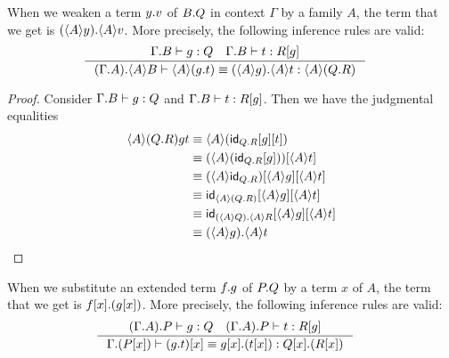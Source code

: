 \begin{lem}
When we weaken a term $\tmext{B}{Q}{y}{v}$ of $\ctxext{B}{Q}$ in context $\Gamma$ by
a family $A$, the term that we get is $\tmext{\ctxwk{A}{B}}{\ctxwk{A}{Q}}{\ctxwk{A}{y}}{\ctxwk{A}{v}}$. More
precisely, the following inference rules are valid:
\begin{align*}
& \inference
  {\jterm{{\Gamma}{B}}{Q}{g}
   \jterm{{\Gamma}{B}}{\subst{g}{R}}{t}}
  {\jtermeq
    {{{\Gamma}{A}}{\ctxwk{A}{B}}}
    {\ctxwk{A}{\ctxext{Q}{R}}}
    {\ctxwk{A}{\tmext{Q}{R}{g}{t}}}
    {\tmext{\ctxwk{A}{Q}}{\ctxwk{A}{R}}{\ctxwk{A}{g}}{\ctxwk{A}{t}}}}
\end{align*}
\end{lem}

\begin{proof}
Consider $\jterm{{\Gamma}{B}}{Q}{g}$ and $\jterm{{\Gamma}{B}}{\subst{g}{R}}{t}$.
Then we have the judgmental equalities
\begin{align*}
\ctxwk{A}{\ctxext{Q}{R}{g}{t}}
& \jdeq \ctxwk{A}{\subst{t}{{g}{\idfunc[\ctxext{Q}{R}]}}}\\
& \jdeq \subst{\ctxwk{A}{t}}{\ctxwk{A}{\subst{g}{\idfunc[\ctxext{Q}{R}]}}}\\
& \jdeq \subst{\ctxwk{A}{t}}{{\ctxwk{A}{g}}{\ctxwk{A}{\idfunc[\ctxext{Q}{R}]}}}\\
& \jdeq \subst{\ctxwk{A}{t}}{{\ctxwk{A}{g}}{\idfunc[\ctxwk{A}{\ctxext{Q}{R}}]}}\\
& \jdeq \subst{\ctxwk{A}{t}}{{\ctxwk{A}{g}}{\idfunc[\ctxext{\ctxwk{A}{Q}}{\ctxwk{A}{R}}]}}\\
& \jdeq \tmext{\ctxwk{A}{Q}}{\ctxwk{A}{R}}{\ctxwk{A}{g}}{\ctxwk{A}{t}}
\end{align*}
\end{proof}

\begin{lem}
When we substitute an extended term $\tmext{P}{Q}{f}{g}$ of $\ctxext{P}{Q}$ by a term
$x$ of $A$, the term that we get is $\tmext{\subst{x}{P}}{\subst{x}{Q}}{\subst{x}{f}}{\subst{x}{g}}$.
More precisely, the following inference rules are valid:
\begin{align*}
& \inference
  {\jterm{{{\Gamma}{A}}{P}}{Q}{g}
   \jterm{{{\Gamma}{A}}{P}}{\subst{g}{R}}{t}}
  {\jtermeq
    {{\Gamma}{\subst{x}{P}}}
    {\ctxext{\subst{x}{Q}}{\subst{x}{R}}}
    {\subst{x}{\tmext{Q}{R}{g}{t}}}
    {\tmext{\subst{x}{Q}}{\subst{x}{R}}{\subst{x}{g}}{\subst{x}{t}}}}
\end{align*}
\end{lem}

